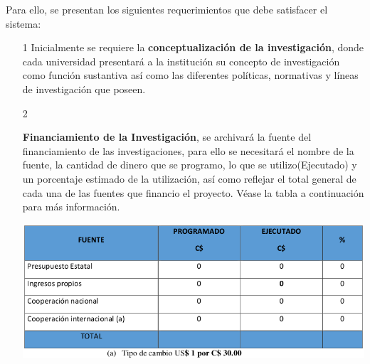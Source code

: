 \documentclass[12pt,letterpaper]{report}
\newcommand{\mb}{\vspace{0.5cm}}
\begin{document}
Para ello, se presentan los siguientes requerimientos que debe satisfacer el sistema:

\begin{itemize}
\item[1]{
Inicialmente se requiere la \textbf{conceptualización de la investigación}, donde cada universidad presentará a la institución su concepto de investigación como función sustantiva así como las diferentes políticas, normativas y líneas de investigación que poseen.
}


\item[2]{
\textbf{Financiamiento de la Investigación}, se archivará la fuente del financiamiento de las investigaciones, para ello se necesitará el nombre de la fuente, la cantidad de dinero que se programo, lo que se utilizo(Ejecutado) y un porcentaje estimado de la utilización, así como reflejar el total general de cada una de las fuentes que financio el proyecto. Véase la tabla a continuación para más información.

\mb
\centering
	\includegraphics[width=\textwidth]{img/tabla2.png}\par
\mb 
}



\end{itemize}
\end{document}
